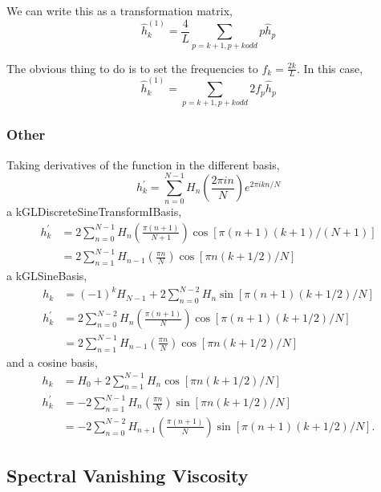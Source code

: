 \documentclass[11pt]{article}
\begin{document}
We can write this as a transformation matrix,
\begin{equation}
\hat{h}_{k}^{(1)} = \frac{4}{L} \sum_{p=k+1, p+k odd} p \hat{h}_p
\end{equation}

The obvious thing to do is to set the frequencies to $f_k = \frac{2k}{L}$. In this case,
\begin{equation}
\hat{h}_{k}^{(1)} = \sum_{p=k+1, p+k odd} 2 f_p \hat{h}_p
\end{equation}

\subsubsection{Other}
Taking derivatives of the function in the different basis,
\begin{equation}
h_k^\prime = \sum_{n=0}^{N-1} H_n \left( \frac{2 \pi i n}{N} \right) e^{2\pi i k n/N}
\end{equation}
a kGLDiscreteSineTransformIBasis,
\begin{align}
h_k^\prime  &= 2 \sum_{n=0}^{N-1} H_n \left( \frac{\pi (n+1)}{N+1} \right) \cos \left[ \pi(n+1)(k+1)/(N+1)\right] \\
&= 2 \sum_{n=1}^{N-1} H_{n-1} \left( \frac{\pi n}{N} \right) \cos \left[ \pi n (k+1/2)/N\right]
\end{align}
a kGLSineBasis,
\begin{align}
h_k &= (-1)^k H_{N-1} + 2 \sum_{n=0}^{N-2} H_n \sin \left[ \pi(n+1)(k+1/2)/N\right] \\
h_k^\prime &=2 \sum_{n=0}^{N-2} H_n  \left( \frac{\pi (n+1)}{N} \right) \cos \left[ \pi(n+1)(k+1/2)/N\right] \\
&=2 \sum_{n=1}^{N-1} H_{n-1}  \left( \frac{\pi n}{N} \right) \cos \left[ \pi n(k+1/2)/N\right]
\end{align}
and a cosine basis,
\begin{align}
h_k &= H_{0} + 2 \sum_{n=1}^{N-1} H_n \cos \left[ \pi n(k+1/2)/N\right] \\
h_k^\prime &= - 2 \sum_{n=1}^{N-1} H_n  \left( \frac{\pi n}{N} \right) \sin \left[ \pi n(k+1/2)/N\right] \\
&= - 2 \sum_{n=0}^{N-2} H_{n+1}  \left( \frac{\pi (n+1)}{N} \right) \sin \left[ \pi (n+1)(k+1/2)/N\right].
\end{align}

%
\subsection{Spectral Vanishing Viscosity}
%
\end{document}
